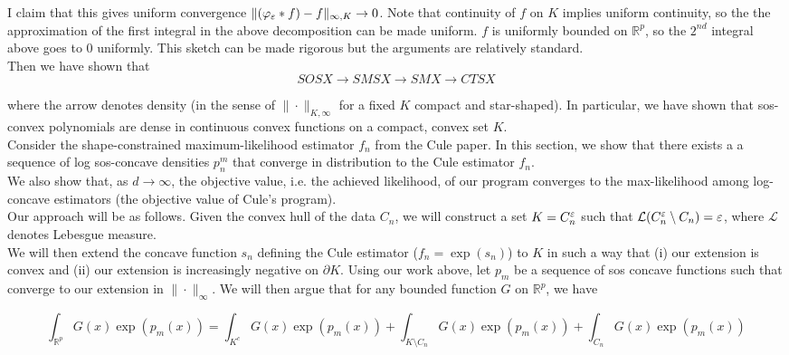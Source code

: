 \documentclass[11pt,reqno]{amsart}
\numberwithin{equation}{section}
\newcommand{\mr}{\mathbb{R}}
\newcommand{\mc}{\mathcal}
\newcommand{\pa}{\partial}
\begin{document}
I claim that this gives uniform convergence $\|(\varphi_{\varepsilon} \ast f) - f\|_{\infty, K} \rightarrow 0$. Note that continuity of $f$ on $K$ implies uniform continuity, so the the approximation of the first integral in the above decomposition can be made uniform. $f$ is uniformly bounded on $\mr^p$, so the $2^{nd}$ integral above goes to $0$ uniformly. This sketch can be made rigorous but the arguments are relatively standard. \\

Then we have shown that \\

\begin{equation} \label{dens-summ}
SOSX \longrightarrow SMSX \longrightarrow SMX \longrightarrow CTSX
\end{equation}

where the arrow denotes density (in the sense of $\| \cdot \|_{K,\infty}$ for a fixed $K$ compact and star-shaped). In particular, we have shown that sos-convex polynomials are dense in continuous convex functions on a compact, convex set $K$. \\

Consider the shape-constrained maximum-likelihood estimator $f_n$ from the Cule paper. In this section, we show that there exists a a sequence of log sos-concave densities $p_n^m$ that converge in distribution to the Cule estimator $f_n$. \\

We also show that, as $d \to \infty$, the objective value, i.e. the achieved likelihood, of our program converges to the max-likelihood among log-concave estimators (the objective value of Cule's program). \\

Our approach will be as follows. Given the convex hull of the data $C_n$, we will construct a set $K = C_n^{\varepsilon}$ such that $\mc{L}(C_n^{\eps} \setminus C_n) = \eps$, where $\mc{L}$ denotes Lebesgue measure. \\

We will then extend the concave function $s_n$ defining the Cule estimator ($f_n = \exp(s_n)$) to $K$ in such a way that (i) our extension is convex and (ii) our extension is increasingly negative on $\pa K$. Using our work above, let $p_m$ be a sequence of sos concave functions such that converge to our extension in $\| \cdot \|_{\infty}$. We will then argue that for any bounded function $G$ on $\mr^p$, we have 

\[
\int_{\mr^p} G(x) \exp(p_m(x)) = \int_{K^c} G(x) \exp(p_m(x)) + \int_{K \setminus C_n} G(x) \exp(p_m(x)) + \int_{C_n} G(x) \exp(p_m(x))
\]
\end{document}
